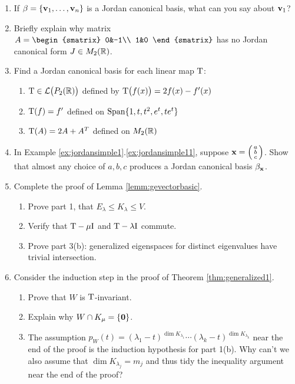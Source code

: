 \begin{exercises}
\begin{enumerate}
		
		\item If $\beta=\{{\mathbf{v}}_1,\ldots,{\mathbf{v}}_{n}\}$ is a Jordan canonical basis, what can you say about ${\mathbf{v}}_1$?
		
		
		\item Briefly explain why matrix $A=
		\begin{smatrix}
			0&-1\\
			1&0
		\end{smatrix}$
		has no Jordan canonical form $J\in M_2(\mathbb{R})$.
		
		
		\item Find a Jordan canonical basis for each linear map $\mathrm{T}$:
		\begin{enumerate}
		  \item $\mathrm{T}\in\mathcal{L}\big(P_2(\mathbb{R})\big)$ defined by $\mathrm{T}\big(f(x)\big)=2f(x)-f'(x)$
		  \item $\mathrm{T}(f)=f'$ defined on $\operatorname{Span}\{1,t,t^2,e^t,te^t\}$
		  \item $\mathrm{T}(A)=2A+A^T$ defined on $M_2(\mathbb{R})$
		\end{enumerate}
		
		
		\item In Example \ref*{ex:jordansimple1}.\ref*{ex:jordansimple11}, suppose ${\mathbf{x}}=\left(\begin{smallmatrix}a\\b\\c\end{smallmatrix}\right)$. Show that almost any choice of $a,b,c$ produces a Jordan canonical basis $\beta_{\mathbf{x}}$.
	
	  
	  \item\label{exs:genevecbasic} Complete the proof of Lemma \ref{lemm:gevectorbasic}.
	  \begin{enumerate}
	    \item Prove part 1, that $E_\lambda\le K_\lambda\le V$.
	    \item Verify that $\mathrm{T}-\mu\mathrm{I}$ and $\mathrm{T}-\lambda\mathrm{I}$ commute.
	    \item Prove part 3(b): generalized eigenspaces for distinct eigenvalues have trivial intersection.
	  \end{enumerate}
	  
	  
	  \item\label{exs:genevecproof} Consider the induction step in the proof of Theorem \ref{thm:generalized1}.
	  \begin{enumerate}
	    \item Prove that $W$ is $\mathrm{T}$-invariant.
	    \item Explain why $W\cap K_\mu=\{\mathbf{0}\}$.
	    \item The assumption $p_W(t)=(\lambda_1-t)^{\dim K_{\lambda_1}}\cdots (\lambda_k-t)^{\dim K_{\lambda_k}}$ near the end of the proof is the induction hypothesis for part 1(b). Why can't we also assume that $\dim K_{\lambda_j}=m_j$ and thus tidy the inequality argument near the end of the proof?
	  \end{enumerate}
	  

\end{enumerate}
\end{exercises}
